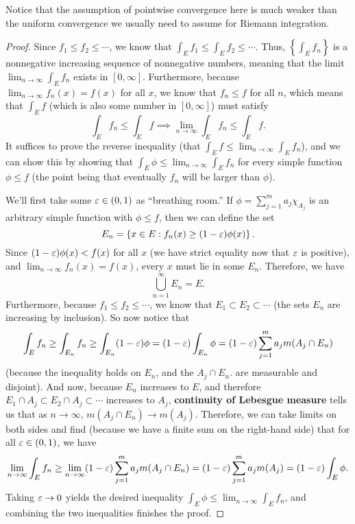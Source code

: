 Notice that the assumption of pointwise convergence here is much weaker than the uniform convergence we usually need to assume for Riemann integration.

\begin{proof}
Since $f_1 \le f_2 \le \cdots$, we know that $\int_E f_1 \le \int_E f_2 \le \cdots$. Thus, $\left\{\int_E f_n\right\}$ is a nonnegative increasing sequence of nonnegative numbers, meaning that the limit $\lim_{n \to \infty} \int_E f_n$ exists in $[0, \infty]$. Furthermore, because $\lim_{n \to \infty} f_n(x) = f(x)$ for all $x$, we know that $f_n \le f$ for all $n$, which means that $\int_E f$ (which is also some number in $[0, \infty]$) must satisfy 
\[
    \int_E f_n \le \int_E f \implies \lim_{n \to \infty}\int_E f_n \le \int_E f.
\]
It suffices to prove the reverse inequality (that $\int_E f \le \lim_{n \to \infty}\int_E f_n$), and we can show this by showing that $\int_E \phi \le \lim_{n \to \infty}\int_E f_n$ for every simple function $\phi \le f$ (the point being that eventually $f_n$ will be larger than $\phi$). 

We'll first take some $\varepsilon \in (0, 1)$ as ``breathing room.'' If $\phi = \sum_{j=1}^m a_j \chi_{A_j}$ is an arbitrary simple function with $\phi \le f$, then we can define the set
\[
    E_n = \left\{x \in E: f_n(x) \ge (1- \varepsilon) \phi(x)\right\}.
\]
Since $(1 - \varepsilon) \phi(x) < f(x)$ for all $x$ (we have strict equality now that $\varepsilon$ is positive), and $\lim_{n \to \infty} f_n(x) = f(x)$, every $x$ must lie in some $E_n$. Therefore, we have
\[
    \bigcup_{n=1}^{\infty} E_n = E.
\]
Furthermore, because $f_1 \le f_2 \le \cdots$, we know that $E_1 \subset E_2 \subset \cdots$ (the sets $E_n$ are increasing by inclusion). So now notice that
\[
    \int_E f_n \ge \int_{E_n} f_n \ge \int_{E_n} (1 - \varepsilon) \phi = (1-\varepsilon) \int_{E_n} \phi = (1 - \varepsilon) \sum_{j=1}^m a_j m(A_j \cap E_n)
\]
(because the inequality holds on $E_n$, and the $A_j \cap E_n$. are measurable and disjoint). And now, because $E_n$ increases to $E$, and therefore $E_1 \cap A_j \subset E_2 \cap A_j \subset \cdots$ increases to $A_j$, \textbf{continuity of Lebesgue measure} tells us that as $n \to \infty$, $m(A_j \cap E_n) \to m(A_j)$. Therefore, we can take limits on both sides and find (because we have a finite sum on the right-hand side) that for all $\varepsilon \in (0, 1)$, we have
\[
    \lim_{n \to \infty} \int_E f_n \ge \lim_{n \to \infty} (1 - \varepsilon) \sum_{j=1}^m a_j m(A_j \cap E_n) = (1 - \varepsilon) \sum_{j=1}^m a_j m(A_j) = (1 - \varepsilon) \int_E \phi.
\]
Taking $\varepsilon \to 0$ yields the desired inequality $\int_E \phi \le \lim_{n \to \infty} \int_E f_n$, and combining the two inequalities finishes the proof.
\end{proof}

